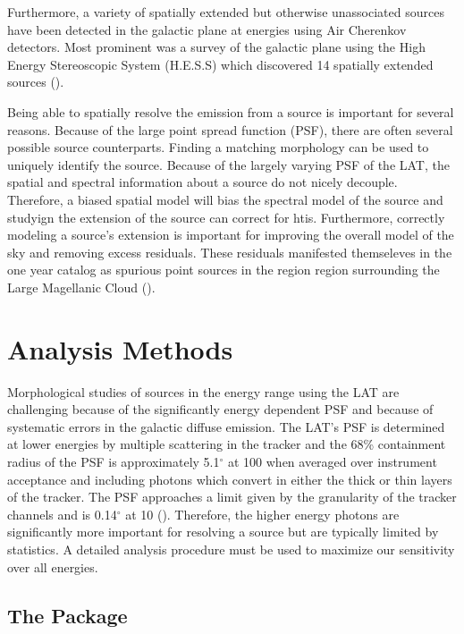 \documentclass[12pt,preprint]{aastex}
\newcommand{\mev}{\text{MeV}\xspace}
\newcommand{\gev}{\text{GeV}\xspace}
\newcommand{\tev}{\text{TeV}\xspace}
\renewcommand{\deg}{\ensuremath{^\circ}\xspace}
\newcommand{\pointlike}{\text{\em pointlike}\xspace}
\begin{document}
Furthermore, a variety of spatially extended but otherwise unassociated
sources have been detected in the galactic plane at \tev energies using
Air Cherenkov detectors. Most prominent was a survey of the galactic plane
using the High Energy Stereoscopic System (H.E.S.S) which discovered 14
spatially extended sources (\cite{HESS_plane_survey}).

Being able to spatially resolve the \gev emission from a source is
important for several reasons. Because of the large point spread
function (PSF), there are often several possible source counterparts.
Finding a matching morphology can be used to uniquely identify the source.
Because of the largely varying PSF of the LAT, the spatial and spectral
information about a source do not nicely decouple. Therefore, a biased
spatial model will bias the spectral model of the source and studyign
the extension of the source can correct for htis.  Furthermore, correctly
modeling a source's extension is important for improving the overall model
of the sky and removing excess residuals.  These residuals manifested
themseleves in the one year catalog as spurious point sources in the
region region surrounding the Large Magellanic Cloud (\cite{first_cat}).


\section{Analysis Methods}

Morphological studies of sources in the \gev energy range
using the LAT are challenging because of the significantly energy
dependent PSF and because of systematic errors in the galactic diffuse
emission.  The LAT's PSF is determined at lower energies by multiple
scattering in the tracker and the 68\% containment radius of the PSF is
approximately 5.1\deg at 100 \mev  when averaged over instrument acceptance
and including photons which convert in either the thick or thin layers of
the tracker. The PSF approaches a limit given by the granularity of the
tracker channels and is 0.14\deg at 10 \gev (\cite{on_orbit_calibration}).
Therefore, the higher energy photons are significantly more important for
resolving a source but are typically limited by statistics. 
A detailed analysis procedure must be used to maximize our
sensitivity over all energies.

\subsection{The \pointlike Package}
\end{document}
